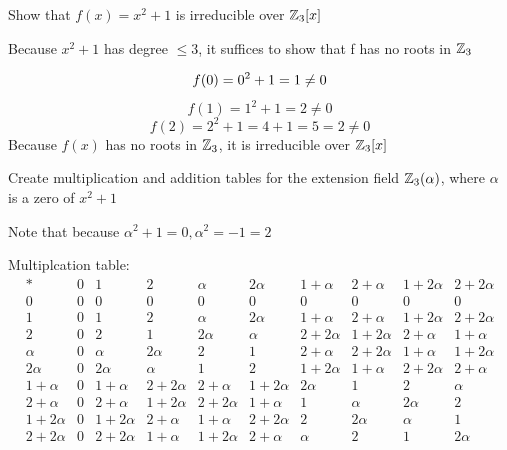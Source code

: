 \documentclass{article}
\begin{document}
\begin{problem}[29.18]
    \begin{subproblem}
        \item Show that $f(x) = x^2 + 1$ is irreducible over $\mathbb{Z}_3[x]$
    \end{subproblem}
    \begin{solution}
        Because $x^2 + 1$ has degree $\leq 3$, it suffices to show that f has no roots in $\mathbb{Z}_3$

        \[f(0) = 0^2 + 1 = 1 \neq 0 \\ \] 
        \[f(1) = 1^2 + 1 = 2 \neq 0\]
        \[f(2) = 2^2 + 1 = 4 + 1 = 5 = 2 \neq 0 \]
        Because $f(x)$ has no roots in $\mathbb{Z}_3$, it is irreducible over $\mathbb{Z}_3[x]$
    \end{solution}
    \begin{subproblem}[resume]
        \item Create multiplication and addition tables for the extension field $\mathbb{Z}_3(\alpha)$, where $\alpha$ is a zero of $x^2 + 1$
    \end{subproblem}
    \begin{solution}
        Note that because $\alpha^2 + 1 = 0, \alpha^2 = -1 = 2$
        
        Multiplcation table:
        \[
            \begin{array}{c|ccccccccc}
                * & 0 & 1 & 2 & \alpha & 2\alpha & 1 + \alpha & 2 + \alpha & 1 + 2\alpha & 2 + 2\alpha \\ \hline
                0 & 0 & 0 & 0 & 0 & 0 & 0 & 0 & 0 & 0 \\
                1 & 0 & 1 & 2 & \alpha & 2\alpha & 1 + \alpha & 2 + \alpha & 1 + 2\alpha & 2 + 2\alpha \\
                2 & 0 & 2 & 1 & 2\alpha & \alpha & 2 + 2\alpha & 1 + 2\alpha & 2 + \alpha & 1 + \alpha \\
                \alpha & 0 & \alpha & 2\alpha & 2 & 1 & 2 + \alpha & 2 + 2\alpha & 1 + \alpha & 1 + 2\alpha \\
                2\alpha & 0 & 2\alpha & \alpha & 1 & 2 & 1 + 2\alpha & 1 + \alpha & 2 + 2\alpha & 2 + \alpha \\
                1 + \alpha & 0 & 1 + \alpha & 2 + 2\alpha & 2 + \alpha & 1 + 2\alpha & 2\alpha & 1 & 2 & \alpha \\
                2 + \alpha & 0 & 2 + \alpha & 1 + 2\alpha & 2 + 2\alpha & 1 + \alpha & 1 & \alpha & 2\alpha & 2 \\
                1 + 2\alpha & 0 & 1 + 2\alpha & 2 + \alpha & 1 + \alpha & 2 + 2\alpha & 2 & 2\alpha & \alpha & 1 \\
                2 + 2\alpha & 0 & 2 + 2\alpha & 1 + \alpha & 1 + 2\alpha & 2 + \alpha & \alpha & 2 & 1 & 2\alpha \\
            \end{array}
            \]


\end{solution}
\end{problem}
\end{document}
